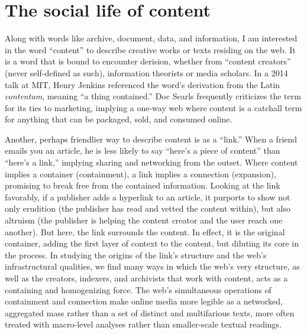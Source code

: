 \section{The social life of content}

Along with words like archive, document, data, and information, I am interested in the word ``content'' to describe creative works or texts residing on the web. It is a word that is bound to encounter derision, whether from ``content creators'' (never self-defined as such), information theorists or media scholars. In a 2014 talk at MIT, Henry Jenkins referenced the word's derivation from the Latin \emph{contentum}, meaning ``a thing contained.''\autocite{whitacre_podcast:_2014-1} Doc Searls frequently criticizes the term for its ties to marketing, implying a one-way web where content is a catchall term for anything that can be packaged, sold, and consumed online.\autocite{searls_earth_2014}

Another, perhaps friendlier way to describe content is as a ``link.'' When a friend emails you an article, he is less likely to say ``here's a piece of content'' than ``here's a link,'' implying sharing and networking from the outset. Where content implies a container (containment), a link implies a connection (expansion), promising to break free from the contained information. Looking at the link favorably, if a publisher adds a hyperlink to an article, it purports to show not only erudition (the publisher has read and vetted the content within), but also altruism (the publisher is helping the content creator and the user reach one another). But here, the link surrounds the content. In effect, it is the original container, adding the first layer of context to the content, but diluting its core in the process. In studying the origins of the link's structure and the web's infrastructural qualities, we find many ways in which the web's very structure, as well as the creators, indexers, and archivists that work with content, acts as a containing and homogenizing force. The web's simultaneous operations of containment and connection make online media more legible as a networked, aggregated mass rather than a set of distinct and multifarious texts, more often treated with macro-level analyses rather than smaller-scale textual readings.


